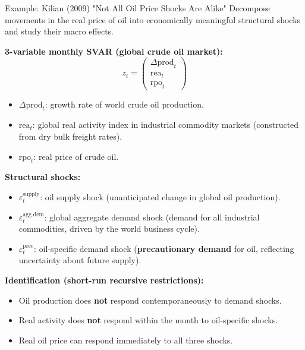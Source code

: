 \documentclass{beamer}
\begin{document}
\begin{frame}{Example: Kilian (2009) "Not All Oil Price Shocks Are Alike"}
\scriptsize
Decompose movements in the real price of oil into economically meaningful structural shocks and study their macro effects.

\medskip
\textbf{3-variable monthly SVAR (global crude oil market):}
\[
z_t =
\begin{pmatrix}
\Delta \text{prod}_t \\ \text{rea}_t \\ \text{rpo}_t
\end{pmatrix}
\]
\begin{itemize}
  \item $\Delta \text{prod}_t$: growth rate of world crude oil production.
  \item $\text{rea}_t$: global real activity index in industrial commodity markets
        (constructed from dry bulk freight rates). 
  \item $\text{rpo}_t$: real price of crude oil.
\end{itemize}

\medskip
\textbf{Structural shocks:}
\begin{itemize}
  \item $\varepsilon^{\text{supply}}_t$: oil supply shock
        (unanticipated change in global oil production).
  \item $\varepsilon^{\text{agg.dem}}_t$: global aggregate demand shock
        (demand for all industrial commodities, driven by the world business cycle).
  \item $\varepsilon^{\text{prec}}_t$: oil-specific demand shock
        (\textbf{precautionary demand} for oil, reflecting uncertainty about future supply).
\end{itemize}

\medskip
\textbf{Identification (short-run recursive restrictions):}
\pause
\begin{itemize}
  \item Oil production does \textbf{not} respond contemporaneously to demand shocks.
  \item Real activity does \textbf{not} respond within the month to oil-specific shocks.
  \item Real oil price can respond immediately to all three shocks.
\end{itemize}
\end{frame}
\end{document}
